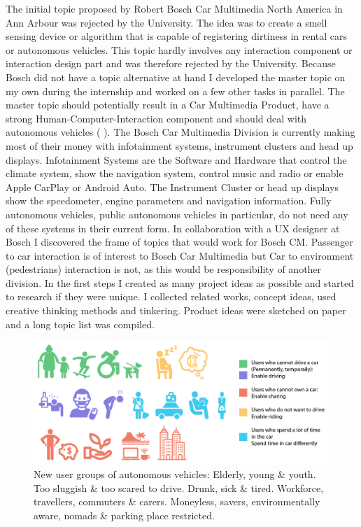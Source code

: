 The initial topic proposed by Robert Bosch Car Multimedia North America in Ann Arbour was rejected by the University. The idea was to create a smell sensing device or algorithm that is capable of registering dirtiness in rental cars or autonomous vehicles. This topic hardly involves any interaction component or interaction design part and was therefore rejected by the University. Because Bosch did not have a topic alternative at hand I developed the master topic on my own during the internship and worked on a few other tasks in parallel. The master topic should potentially result in a Car Multimedia Product, have a strong Human-Computer-Interaction component and should deal with autonomous vehicles ( ). The Bosch Car Multimedia Division is currently making most of their money with infotainment systems, instrument clusters and head up displays. Infotainment Systems are the Software and Hardware that control the climate system, show the navigation system, control music and radio or enable Apple CarPlay or Android Auto. The Instrument Cluster or head up displays show the speedometer, engine parameters and navigation information. Fully autonomous vehicles, public autonomous vehicles in particular, do not need any of these systems in their current form. In collaboration with a UX designer at Bosch I discovered the frame of topics that would work for Bosch CM. Passenger to car interaction is of interest to Bosch Car Multimedia but Car to environment (pedestrians) interaction is not, as this would be responsibility of another division. In the first steps I created as many project ideas as possible and started to research if they were unique. I collected related works, concept ideas, used creative thinking methods and tinkering. Product ideas were sketched on paper and a long topic list was compiled. 
\begin{figure}
    \includegraphics[width=1\textwidth]{fig/users.png}
    \caption[Users]{New user groups of autonomous vehicles: Elderly, young \& youth. Too sluggish \& too scared to drive. Drunk, sick \& tired. Workforce, travellers, commuters \& carers. Moneyless, savers, environmentally aware, nomads \& parking place restricted.}
    \label{fig:users}
\end{figure}

